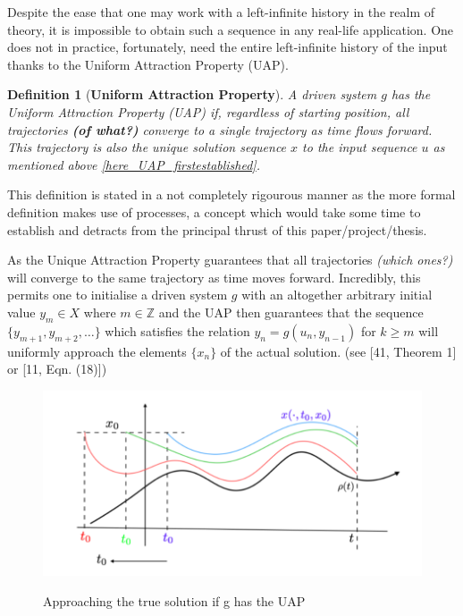\documentclass[a4paper,12pt,twoside]{book}
\newtheorem{Definition}{Definition}[]
\begin{document}
Despite the ease that one may work with a left-infinite history in the realm of theory, it is impossible to obtain such a sequence in any real-life application.  
One does not in practice, fortunately, need the entire left-infinite history of the input thanks to the Uniform Attraction Property (UAP).

\begin{Definition}
  [\bf Uniform Attraction Property]\label{Dfn_UAP}
  A driven system $g$ has the Uniform Attraction Property (UAP) if, regardless of starting position, all trajectories \textbf{(of what?)} converge to a single trajectory as time flows forward. 
  This trajectory is also the unique solution sequence $x$ to the input sequence $u$ as mentioned above \ref{here_UAP_firstestablished}.
\end{Definition}

This definition is stated in a not completely rigourous manner as the more formal definition makes use of processes, a concept which would take some time to establish and detracts from the principal thrust of this paper/project/thesis. 

As the Unique Attraction Property guarantees that all trajectories \textit{(which ones?)} will converge to the same trajectory as time moves forward. 
Incredibly, this permits one to initialise a driven system $g$ with an altogether arbitrary initial value $y_m\in{X}$ where $m\in\mathbb{Z}$ and the UAP then guarantees that the sequence $\{y_{m+1}, y_{m+2},\ldots\}$ which satisfies the relation $y_n=g(u_n, y_{n-1})$  for  $k\geq{m}$  will uniformly approach the elements $\{x_n\}$ of the actual solution. (see [41, Theorem 1] or [11, Eqn. (18)]) 
 

\begin{figure}[ht]
  \includegraphics[scale=0.4]{memloss_conttime.png}
  \centering
  \label{fig:memoryLosscont_time}
\caption{Approaching the true solution if g has the UAP}
\end{figure}
\end{document}
